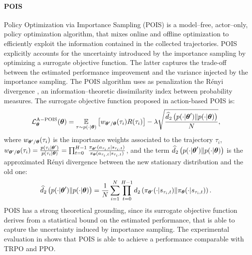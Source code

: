 \paragraph{POIS} Policy Optimization via Importance Sampling (POIS) \citep{metellipolicy2018} is a model--free, actor--only, policy optimization algorithm, that mixes online and offline optimization to efficiently exploit the information contained in the collected trajectories. POIS explicitly accounts for the uncertainty introduced by the importance sampling by optimizing a surrogate objective function. The latter captures the trade-off between the estimated performance improvement and the variance injected by the importance sampling. The POIS algorithm uses as penalization the Rényi divergence \citep{renyi1961,  DBLP:journals/corr/abs-1206-2459}, an information--theoretic dissimilarity index between probability measures. The surrogate objective function proposed in action-based POIS is:
  \begin{equation}
	\mathcal{L}_{\boldsymbol{\theta}}^{\mathrm{A-POIS}}(\bm{\mathbf{\theta}}) = \underset{
 	\begin{subarray}{c}
 		\tau \sim p(\cdot|\bm{\mathbf{\theta}})
 	\end{subarray}
 	}{\mathbb{E}} \left[ w_{\bm{\mathbf{\theta}}'/\bm{\mathbf{\theta}}}(\tau_i) R(\tau_i)\right] - \lambda \sqrt{ \frac{\widehat{d}_2 \left( p(\cdot|\bm{\mathbf{\theta}}') \| p(\cdot|\bm{\mathbf{\theta}}) \right) }{N}  },
\end{equation}
where $w_{\bm{\mathbf{\theta}}'/\bm{\mathbf{\theta}}}(\tau_i)$ is the importance weights associated to the trajectory $\tau_i$, \newline $w_{\bm{\mathbf{\theta}}'/\bm{\mathbf{\theta}}}(\tau_i) = \frac{p(\tau_i|\bm{\mathbf{\theta}}')}{p(\tau_i|\bm{\mathbf{\theta}})} = \prod_{t=0}^{H-1} \frac{\pi_{\bm{\mathbf{\theta}}'}(a_{\tau_i,t}|s_{\tau_i,t})}{\pi_{\bm{\mathbf{\theta}}}(a_{\tau_i,t}|s_{\tau_i,t})}$, and the term $\widehat{d}_2 \left( p(\cdot|\bm{\mathbf{\theta}}') \| p(\cdot|\bm{\mathbf{\theta}}) \right)$ is the approximated Rényi divergence between the new stationary distribution and the old one: $$\widehat{d}_2\left(p(\cdot|\bm{\mathbf{\theta}}') \| p(\cdot|\bm{\mathbf{\theta}}) \right) = \frac{1}{N} \sum_{i=1}^N \prod_{t=0}^{H-1} d_{2} \left( \pi_{\bm{\mathbf{\theta}}'}(\cdot|s_{\tau_i,t}) \| \pi_{\bm{\mathbf{\theta}}}(\cdot|s_{\tau_i,t})\right).$$
POIS has a strong theoretical grounding, since its surrogate objective function derives from a statistical bound on the estimated performance, that is able to capture the uncertainty induced by importance sampling. The experimental evaluation in \citep{metellipolicy2018} shows that POIS is able to achieve a performance comparable with TRPO and PPO.